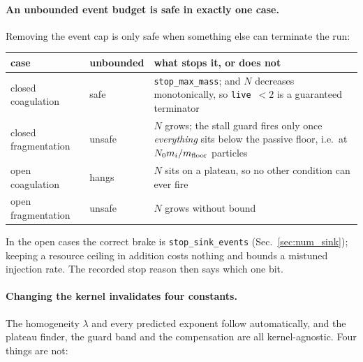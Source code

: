 \documentclass[a4paper,12pt]{article}
\newcommand{\code}[1]{\texttt{#1}}
\begin{document}
\paragraph{An unbounded event budget is safe in exactly one case.}
Removing the event cap is only safe when something else can terminate the
run:

\begin{center}
\small
\begin{tabular}{@{}l l p{7.4cm}@{}}
\toprule
case & unbounded & what stops it, or does not \\
\midrule
closed coagulation   & safe   & \code{stop\_max\_mass}; and $N$ decreases monotonically,
                                so \code{live}~$<2$ is a guaranteed terminator \\
closed fragmentation & unsafe & $N$ grows; the stall guard fires only once
                                \emph{everything} sits below the passive floor,
                                i.e.\ at $N_0 m_i/m_{\rm floor}$ particles \\
open coagulation     & hangs  & $N$ sits on a plateau, so no other condition
                                can ever fire \\
open fragmentation   & unsafe & $N$ grows without bound \\
\bottomrule
\end{tabular}
\end{center}

In the open cases the correct brake is \code{stop\_sink\_events}
(Sec.~\ref{sec:num_sink}); keeping a resource ceiling in addition costs
nothing and bounds a mistuned injection rate. The recorded stop reason then
says which one bit.

\paragraph{Changing the kernel invalidates four constants.}
The homogeneity $\lambda$ and every predicted exponent follow automatically,
and the plateau finder, the guard band and the compensation are all
kernel-agnostic. Four things are not:
\end{document}
